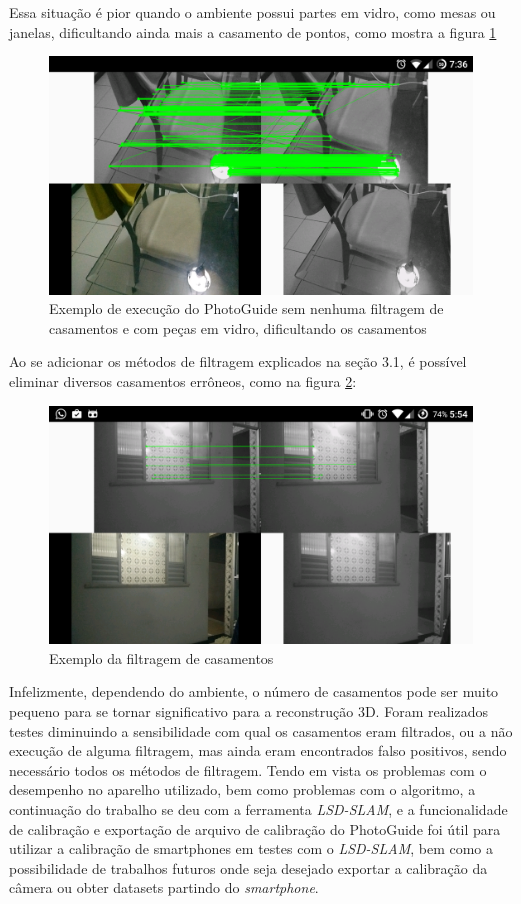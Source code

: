 Essa situação é pior quando o ambiente possui partes em vidro, como mesas ou janelas, dificultando ainda mais a casamento de pontos, como mostra a figura \ref{fig4:3}

\begin{figure}[!htb]
	\centering
		\includegraphics[width= \textwidth]{Imagens/figura4-3.png}
	\caption{Exemplo de execução do PhotoGuide sem nenhuma filtragem de casamentos e com peças em vidro, dificultando os casamentos}
	\label{fig4:3}
\end{figure}

Ao se adicionar os métodos de filtragem explicados na seção 3.1, é possível eliminar diversos casamentos errôneos, como na figura \ref{fig4:4}:

\begin{figure}[!htb]
	\centering
		\includegraphics[width= \textwidth]{Imagens/figura3-2E4-4.png}
	\caption{Exemplo da filtragem de casamentos}
	\label{fig4:4}
\end{figure}

Infelizmente, dependendo do ambiente, o número de casamentos pode ser muito pequeno para se tornar significativo para a reconstrução 3D. Foram realizados testes diminuindo a sensibilidade com qual os casamentos eram filtrados, ou a não execução de alguma filtragem, mas ainda eram encontrados falso positivos, sendo necessário todos os métodos de filtragem. 
	Tendo em vista os problemas com o desempenho no aparelho utilizado, bem como problemas com o algoritmo, a continuação do trabalho se deu com a ferramenta \textit{LSD-SLAM}, e a funcionalidade de calibração e exportação de arquivo de calibração do PhotoGuide foi útil para utilizar a calibração de smartphones em testes com o \textit{LSD-SLAM}, bem como a possibilidade de trabalhos futuros onde seja desejado exportar a calibração da câmera ou obter datasets partindo do \textit{smartphone}.
	

